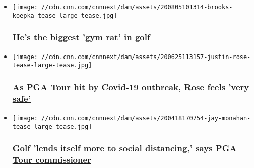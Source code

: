 \begin{itemize}
\item
  \href{/2020/08/05/golf/brooks-koepka-traditional-mould-golf-pga-championship/index.html}{}

  \texttt{[image: //cdn.cnn.com/cnnnext/dam/assets/200805101314-brooks-koepka-tease-large-tease.jpg]}

  \hypertarget{hes-the-biggest-gym-rat-in-golf}{%
  \subsubsection{\texorpdfstring{\href{/2020/08/05/golf/brooks-koepka-traditional-mould-golf-pga-championship/index.html}{He's
  the biggest 'gym rat' in
  golf}}{He's the biggest 'gym rat' in golf}}\label{hes-the-biggest-gym-rat-in-golf}}
\item
  \href{/2020/06/25/golf/justin-rose-covid-19-travelers-championship-spt-intl/index.html}{}

  \texttt{[image: //cdn.cnn.com/cnnnext/dam/assets/200625113157-justin-rose-tease-large-tease.jpg]}

  \hypertarget{as-pga-tour-hit-by-covid-19-outbreak-rose-feels-very-safe}{%
  \subsubsection{\texorpdfstring{\href{/2020/06/25/golf/justin-rose-covid-19-travelers-championship-spt-intl/index.html}{As
  PGA Tour hit by Covid-19 outbreak, Rose feels 'very
  safe'}}{As PGA Tour hit by Covid-19 outbreak, Rose feels 'very safe'}}\label{as-pga-tour-hit-by-covid-19-outbreak-rose-feels-very-safe}}
\item
  \href{/2020/04/18/golf/jay-monahan-golf-pga-tour-coronavirus-trump-spt-intl/index.html}{}

  \texttt{[image: //cdn.cnn.com/cnnnext/dam/assets/200418170754-jay-monahan-tease-large-tease.jpg]}

  \hypertarget{golf-lends-itself-more-to-social-distancing-says-pga-tour-commissioner}{%
  \subsubsection{\texorpdfstring{\href{/2020/04/18/golf/jay-monahan-golf-pga-tour-coronavirus-trump-spt-intl/index.html}{Golf
  'lends itself more to social distancing,' says PGA Tour
  commissioner}}{Golf 'lends itself more to social distancing,' says PGA Tour commissioner}}\label{golf-lends-itself-more-to-social-distancing-says-pga-tour-commissioner}}
\end{itemize}


